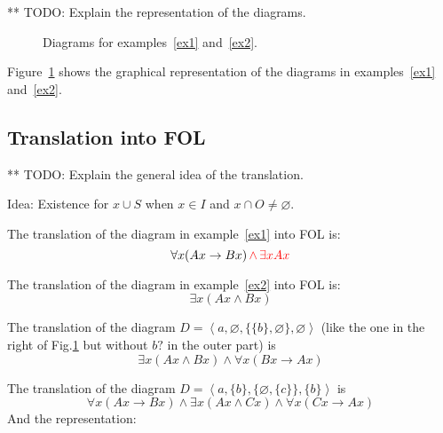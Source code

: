 \documentclass{article}
\newcommand{\cred}[1]{{\color{red}#1}}
\begin{document}
\cred{** TODO: Explain the representation of the diagrams.}

\begin{figure}[htbp!]
    \centering
    \hspace{2cm}
    \caption{Diagrams for examples~\ref{ex1} and~\ref{ex2}.}
    \label{fig:initExamples}
\end{figure}

Figure~\ref{fig:initExamples} shows the graphical representation of the diagrams in examples~\ref{ex1} and~\ref{ex2}. 

\subsection{Translation into FOL}

\cred{** TODO: Explain the general idea of the translation.}

\cred{Idea: Existence for $x\cup S$ when $x\in I$ and $x\cap O \neq\varnothing$.}

The translation of the diagram in example~\ref{ex1} into FOL is:
\[
\forall x (Ax \to Bx) \,\cred{\land\, \exists x Ax} 
\]

The translation of the diagram in example~\ref{ex2} into FOL is:
\[
\exists x (Ax \land Bx)
\]

The translation of the diagram
$D=\left<a,\varnothing, \{\{b\},\varnothing\}, \varnothing\right>$ (like the one in the right of Fig.\ref{fig:initExamples} but without $b?$ in the outer part) is
\[
\exists x (Ax \land Bx) \land \forall x (Bx \to Ax)
\]

The translation of the  diagram 
$D=\left<a,\{b\}, \{\varnothing, \{c\}\},\{b\}\right>$ is
\[
\forall x (Ax \to Bx) \land \exists x (Ax \land Cx) \land \forall x (Cx\to Ax)
\]
And the representation:
\begin{center}
\end{center}
\end{document}
